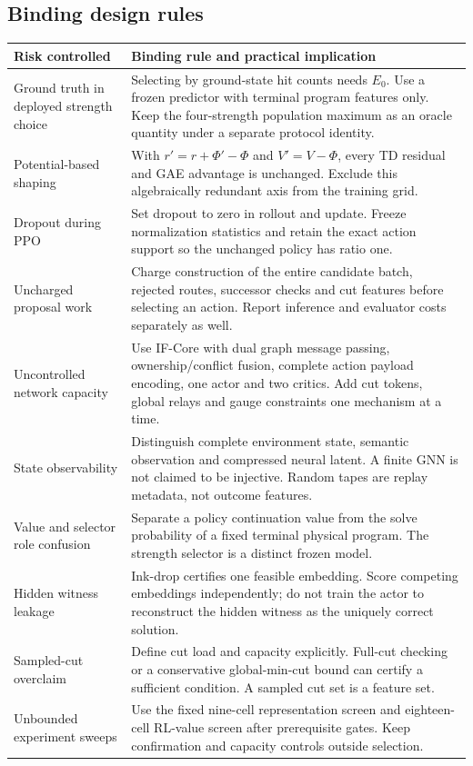 \documentclass[11pt,a4paper]{article}
\theoremstyle{definition}\newtheorem{definition}[proposition]{Definition}
\begin{document}
\subsection*{Binding design rules}
{\small
\begin{longtable}{@{}P{.22\textwidth}P{.71\textwidth}@{}}
\toprule
Risk controlled & Binding rule and practical implication\\\midrule\endhead
Ground truth in deployed strength choice & Selecting by ground-state hit counts needs $E_0$. Use a frozen predictor with terminal program features only. Keep the four-strength population maximum as an oracle quantity under a separate protocol identity.\\
Potential-based shaping & With $r'=r+\Phi'-\Phi$ and $V'=V-\Phi$, every TD residual and GAE advantage is unchanged. Exclude this algebraically redundant axis from the training grid.\\
Dropout during PPO & Set dropout to zero in rollout and update. Freeze normalization statistics and retain the exact action support so the unchanged policy has ratio one.\\
Uncharged proposal work & Charge construction of the entire candidate batch, rejected routes, successor checks and cut features before selecting an action. Report inference and evaluator costs separately as well.\\
Uncontrolled network capacity & Use IF-Core with dual graph message passing, ownership/conflict fusion, complete action payload encoding, one actor and two critics. Add cut tokens, global relays and gauge constraints one mechanism at a time.\\
State observability & Distinguish complete environment state, semantic observation and compressed neural latent. A finite GNN is not claimed to be injective. Random tapes are replay metadata, not outcome features.\\
Value and selector role confusion & Separate a policy continuation value from the solve probability of a fixed terminal physical program. The strength selector is a distinct frozen model.\\
Hidden witness leakage & Ink-drop certifies one feasible embedding. Score competing embeddings independently; do not train the actor to reconstruct the hidden witness as the uniquely correct solution.\\
Sampled-cut overclaim & Define cut load and capacity explicitly. Full-cut checking or a conservative global-min-cut bound can certify a sufficient condition. A sampled cut set is a feature set.\\
Unbounded experiment sweeps & Use the fixed nine-cell representation screen and eighteen-cell RL-value screen after prerequisite gates. Keep confirmation and capacity controls outside selection.\\
\bottomrule
\end{longtable}}
\end{document}
